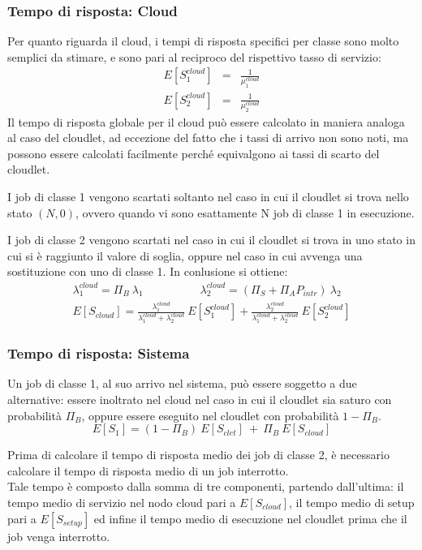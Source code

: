 \subsubsection{Tempo di risposta: Cloud}
Per quanto riguarda il cloud, i tempi di risposta specifici per classe sono
molto semplici da stimare, e sono pari al reciproco del rispettivo tasso di
servizio:
\begin{eqnarray}
E[S_1^{cloud}] &=& \frac{1}{\mu_1^{cloud}} \\
E[S_2^{cloud}] &=& \frac{1}{\mu_2^{cloud}}
\end{eqnarray}
Il tempo di risposta globale per il cloud può essere calcolato in maniera
analoga al caso del cloudlet, ad eccezione del fatto che i tassi di arrivo non
sono noti, ma possono essere calcolati facilmente perché equivalgono ai tassi di
scarto del cloudlet.

I job di classe 1 vengono scartati soltanto nel caso in cui il cloudlet si trova
nello stato $(N, 0)$, ovvero quando vi sono esattamente N job di classe 1 in
esecuzione.

I job di classe 2 vengono scartati nel caso in cui il cloudlet si trova in uno
stato in cui si è raggiunto il valore di soglia, oppure nel caso in cui avvenga
una sostituzione con uno di classe 1. In conlusione si ottiene:
\begin{eqnarray}
\lambda_1^{cloud} = \Pi_B \ \lambda_1 
\qquad\quad\qquad
\lambda_2^{cloud} = (\Pi_S + \Pi_A P_{intr}) \ \lambda_2 \nonumber\\[4pt]
E[S_{cloud}] = 
\frac{\lambda_1^{cloud}}{\lambda_1^{cloud}+\lambda_2^{cloud}} \ E[S_1^{cloud}] +
\frac{\lambda_2^{cloud}}{\lambda_1^{cloud}+\lambda_2^{cloud}} \ E[S_2^{cloud}] 
\end{eqnarray}
%
\subsubsection{Tempo di risposta: Sistema}
Un job di classe 1, al suo arrivo nel sistema, può essere soggetto a due
alternative: essere inoltrato nel cloud nel caso in cui il cloudlet sia saturo
con probabilità $\Pi_B$, oppure essere eseguito nel cloudlet con probabilità
$1-\Pi_B$.
\begin{equation}
E[S_1] = (1-\Pi_B) \ E[S_{clet}] \ + \ \Pi_B \ E[S_{cloud}]
\end{equation}

Prima di calcolare il tempo di risposta medio dei job di classe 2, è necessario
calcolare il tempo di risposta medio di un job interrotto.\\
Tale tempo è composto dalla somma di tre componenti, partendo dall'ultima: il
tempo medio di servizio nel nodo cloud pari a $E[S_{cloud}]$, il tempo medio di
setup pari a $E[S_{setup}]$ ed infine il tempo medio di esecuzione nel cloudlet
prima che il job venga interrotto.

